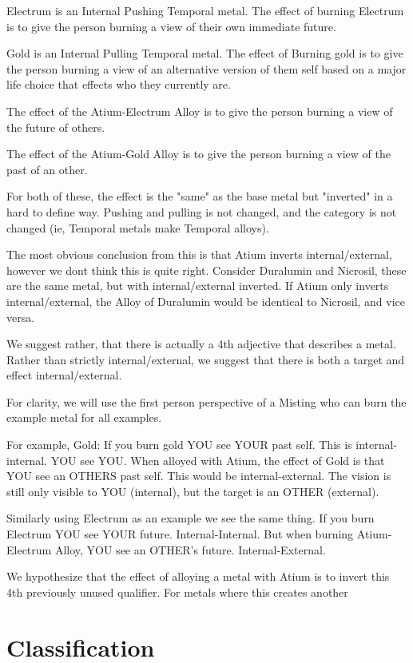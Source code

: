 \documentclass[conference]{IEEEtran}
\begin{document}
Electrum is an Internal Pushing Temporal metal.  The effect of burning Electrum is to give the person burning a view of their own immediate future.

Gold is an Internal Pulling Temporal metal.  The effect of Burning gold is to give the person burning a view of an alternative version of them self based on a major life choice that effects who they currently are.

The effect of the Atium-Electrum Alloy is to give the person burning a view of the future of others.

The effect of the Atium-Gold Alloy is to give the person burning a view of the past of an other.

For both of these, the effect is the "same" as the base metal but "inverted" in a hard to define way. Pushing and pulling is not changed, and the category is not changed (ie, Temporal metals make Temporal alloys).

The most obvious conclusion from this is that Atium inverts internal/external, however we dont think this is quite right.  Consider Duralumin and Nicrosil, these are the same metal, but with internal/external inverted.  If Atium only inverts internal/external, the Alloy of Duralumin would be identical to Nicrosil, and vice versa.

We suggest rather, that there is actually a 4th adjective that describes a metal.  Rather than strictly internal/external, we suggest that there is both a target and effect internal/external.

For clarity, we will use the first person perspective of a Misting who can burn the example metal for all examples.

For example, Gold: If you burn gold YOU see YOUR past self.  This is internal-internal.  YOU see YOU.  When alloyed with Atium, the effect of Gold is that YOU see an OTHERS past self.  This would be internal-external.  The vision is still only visible to YOU (internal), but the target is an OTHER (external).

Similarly using Electrum as an example we see the same thing.  If you burn Electrum YOU see YOUR future.  Internal-Internal.  But when burning Atium-Electrum Alloy, YOU see an OTHER's future.  Internal-External.

We hypothesize that the effect of alloying a metal with Atium is to invert this 4th previously unused qualifier.  For metals where this creates another 	
\section{Classification}
\end{document}
